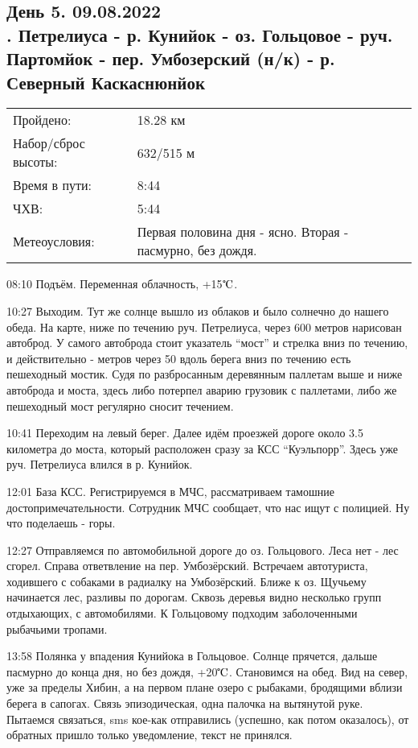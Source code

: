 \subsection{День 5. 09.08.2022\\
. Петрелиуса - р. Кунийок - оз. Гольцовое  - руч. Партомйок - пер. Умбозерский (н/к) - р. Северный Каскаснюнйок}
\begin{tabular}{l p{12cm}}
\hline
Пройдено: & 18.28 км\\
Набор/сброс высоты: & 632/515 м\\
Время в пути: & 8:44\\
ЧХВ: & 5:44\\
Метеоусловия: & Первая половина дня - ясно. Вторая - пасмурно, без дождя.\\
\hline
\end{tabular}

08:10 Подъём. Переменная облачность, +15$\tccentigrade$.

10:27 Выходим.
Тут же солнце вышло из облаков и было солнечно до нашего обеда.
На карте, ниже по течению руч. Петрелиуса, через 600 метров нарисован автоброд.
У самого автоброда стоит указатель “мост” и стрелка вниз по течению, и действительно - метров через 50 вдоль берега
вниз по течению есть пешеходный мостик. Судя по разбросанным деревянным паллетам выше и ниже автоброда и моста,
здесь либо потерпел аварию грузовик с паллетами, либо же пешеходный мост регулярно сносит течением.

10:41 Переходим на левый берег. Далее идём проезжей дороге около 3.5 километра до моста,
который расположен сразу за КСС “Куэльпорр”. Здесь уже руч. Петрелиуса влился в р. Кунийок.

12:01 База КСС. Регистрируемся в МЧС, рассматриваем тамошние достопримечательности.
Сотрудник МЧС сообщает, что нас ищут с полицией. Ну что поделаешь - горы.

12:27 Отправляемся по автомобильной дороге до оз. Гольцового. Леса нет - лес сгорел.
Справа ответвление на пер. Умбозёрский. Встречаем автотуриста, ходившего с собаками в радиалку на Умбозёрский.
Ближе к оз. Щучьему начинается лес, разливы по дорогам. Сквозь деревья видно несколько групп отдыхающих, с автомобилями.
К Гольцовому подходим заболоченными рыбачьими тропами.

13:58 Полянка у впадения Кунийока в Гольцовое. Солнце прячется, дальше пасмурно до конца дня, но без дождя, +20$\tccentigrade$.
Становимся на обед. Вид на север, уже за пределы Хибин, а на первом плане озеро с рыбаками,
бродящими вблизи берега в сапогах. Связь эпизодическая, одна палочка на вытянутой руке. Пытаемся связаться,
sms кое-как отправились (успешно, как потом оказалось), от обратных пришло только уведомление, текст не принялся.

